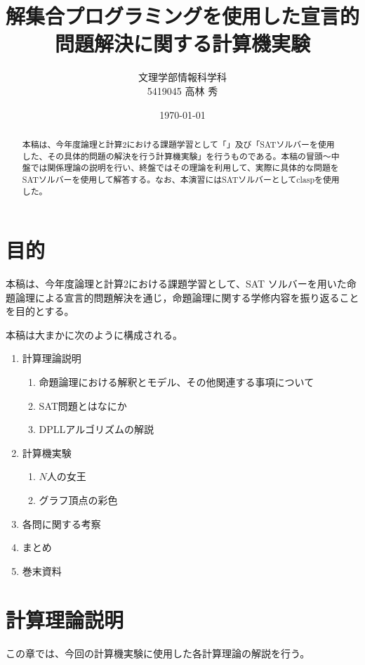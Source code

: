 \documentclass[dvipdfmx]{jsarticle}
\title{解集合プログラミングを使用した宣言的問題解決に関する計算機実験}
\author{文理学部情報科学科\\5419045 高林 秀}
\date{\today}
\begin{document}
\maketitle

\begin{abstract}
本稿は、今年度論理と計算2における課題学習として「」及び「SATソルバーを使用した、その具体的問題の解決を行う計算機実験」を行うものである。本稿の冒頭〜中盤では関係理論の説明を行い、終盤ではその理論を利用して、実際に具体的な問題をSATソルバーを使用して解答する。なお、本演習にはSATソルバーとしてclaspを使用した。
\end{abstract}

\section{目的}
本稿は、今年度論理と計算2における課題学習として、SAT ソルバーを用いた命題論理による宣言的問題解決を通じ，命題論理に関する学修内容を振り返ることを目的とする。\par
本稿は大まかに次のように構成される。
\begin{enumerate}
  \item 計算理論説明
  \begin{enumerate}
    \item 命題論理における解釈とモデル、その他関連する事項について
    \item SAT問題とはなにか
    \item DPLLアルゴリズムの解説
  \end{enumerate}
  \item 計算機実験
  \begin{enumerate}
    \item $N$人の女王
    \item グラフ頂点の彩色
  \end{enumerate}
  \item 各問に関する考察
  \item まとめ
  \item 巻末資料
\end{enumerate}
\section{計算理論説明}
この章では、今回の計算機実験に使用した各計算理論の解説を行う。
\end{document}
